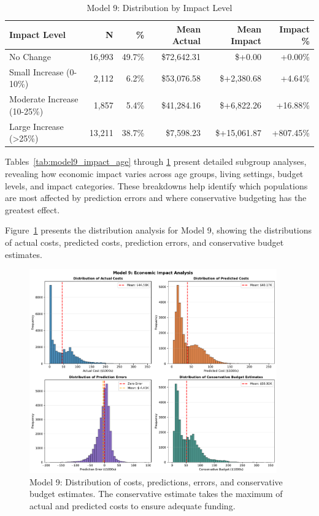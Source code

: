 \begin{table}[htbp]
\centering
\small
\caption{Model 9: Distribution by Impact Level}
\label{tab:model9_impact_distribution}
\begin{tabular}{lrrrrr}
\toprule
\textbf{Impact Level} & \textbf{N} & \textbf{\%} & \textbf{Mean Actual} & \textbf{Mean Impact} & \textbf{Impact \%} \\
\midrule
No Change & 16,993 & 49.7\% & \$72,642.31 & \$+0.00 & +0.00\% \\
Small Increase (0-10\%) & 2,112 & 6.2\% & \$53,076.58 & \$+2,380.68 & +4.64\% \\
Moderate Increase (10-25\%) & 1,857 & 5.4\% & \$41,284.16 & \$+6,822.26 & +16.88\% \\
Large Increase (>25\%) & 13,211 & 38.7\% & \$7,598.23 & \$+15,061.87 & +807.45\% \\
\bottomrule
\end{tabular}
\end{table}

Tables~\ref{tab:model9_impact_age} through \ref{tab:model9_impact_distribution} present detailed subgroup analyses, revealing how economic impact varies across age groups, living settings, budget levels, and impact categories. These breakdowns help identify which populations are most affected by prediction errors and where conservative budgeting has the greatest effect.

Figure~\ref{fig:model9_impact_histograms} presents the distribution analysis for Model 9, showing the distributions of actual costs, predicted costs, prediction errors, and conservative budget estimates.

\begin{figure}[htbp]
\centering
\includegraphics[width=0.95\textwidth]{figures/model_9_Impact_Histograms.pdf}
\caption{Model 9: Distribution of costs, predictions, errors, and conservative budget estimates. The conservative estimate takes the maximum of actual and predicted costs to ensure adequate funding.}
\label{fig:model9_impact_histograms}
\end{figure}

